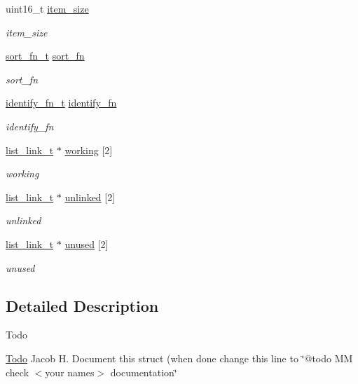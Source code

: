\begin{DoxyCompactItemize}
uint16\+\_\+t \hyperlink{structlist__t_a5f3a65f91da217e59d1f0d9069a23b07}{item\+\_\+size}
\begin{DoxyCompactList}\small\item\em item\+\_\+size \end{DoxyCompactList}\item 
\hyperlink{group__list_gaec41fb00279c4e4ec77286fa803cbcd2}{sort\+\_\+fn\+\_\+t} \hyperlink{structlist__t_a63ac7c8ef2439d1fe9ed4f15d6b34673}{sort\+\_\+fn}
\begin{DoxyCompactList}\small\item\em sort\+\_\+fn \end{DoxyCompactList}\item 
\hyperlink{group__list_ga608e5ebc97d34a9cd07a2c44925a1dc2}{identify\+\_\+fn\+\_\+t} \hyperlink{structlist__t_a06c316a9560c5d58461c9237d0a81f69}{identify\+\_\+fn}
\begin{DoxyCompactList}\small\item\em identify\+\_\+fn \end{DoxyCompactList}\item 
\hyperlink{structlist__link__t}{list\+\_\+link\+\_\+t} $\ast$ \hyperlink{structlist__t_a06c2beb66c1b4f8684e734cfef26e698}{working} \mbox{[}2\mbox{]}
\begin{DoxyCompactList}\small\item\em working \end{DoxyCompactList}\item 
\hyperlink{structlist__link__t}{list\+\_\+link\+\_\+t} $\ast$ \hyperlink{structlist__t_a1d3f9e10efa30431b659ad02991eabd4}{unlinked} \mbox{[}2\mbox{]}
\begin{DoxyCompactList}\small\item\em unlinked \end{DoxyCompactList}\item 
\hyperlink{structlist__link__t}{list\+\_\+link\+\_\+t} $\ast$ \hyperlink{structlist__t_a0e724876cc007c8317967a42645e77a7}{unused} \mbox{[}2\mbox{]}
\begin{DoxyCompactList}\small\item\em unused \end{DoxyCompactList}\end{DoxyCompactItemize}


\subsection{Detailed Description}
\begin{DoxyRefDesc}{Todo}
\item[\hyperlink{todo__todo000012}{Todo}]Jacob H. Document this struct (when done change this line to \char`\"{}@todo M\+M check $<$your names$>$ documentation\char`\"{} \end{DoxyRefDesc}



